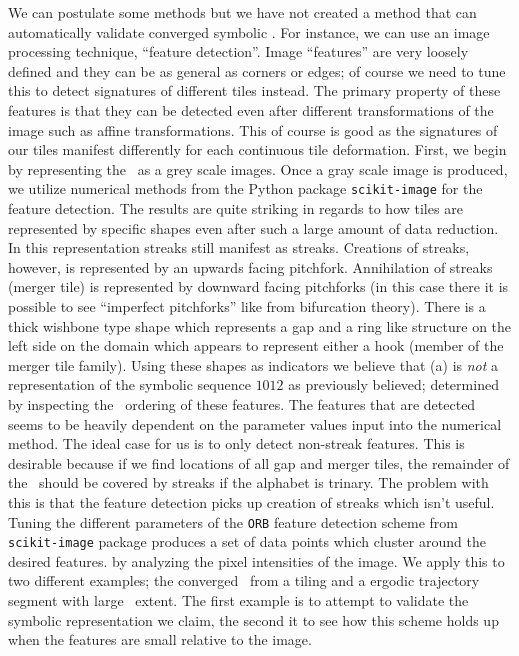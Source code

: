 We can postulate some methods but we have not created a method
that can automatically validate converged symbolic \twots. For instance,
we can use an image processing technique, ``feature detection''.
Image ``features'' are very loosely defined and they can be as general
as corners or edges; of course we need to tune this to
detect signatures of different tiles instead. The primary
property of these features is that they can be detected
even after different transformations of the image such as
affine transformations. This of course is good as the signatures
of our tiles manifest differently for each continuous tile
deformation.
First, we begin by representing the \twot\ as a grey scale
images. Once a gray scale image is produced, we utilize
numerical methods from the Python package \texttt{scikit-image} for
the feature detection.
The results are quite striking in regards to how tiles are represented by specific
shapes even after such a large amount of data reduction.
In this representation streaks still manifest as streaks. Creations of streaks, however,
is represented by an upwards facing pitchfork. Annihilation of streaks (merger tile) is
represented by downward facing pitchforks (in this case there
it is possible to see ``imperfect pitchforks'' like from bifurcation theory).
There is a thick wishbone type shape
which represents a gap and a ring like structure on the left side on
the domain which appears to represent either a hook (member of the
merger tile family).
Using these shapes as indicators we believe that (a) is \textit{not} a
representation of the symbolic sequence $1012$ as previously believed; determined
by inspecting the \spt\ ordering of these features.
The features that are detected seems
to be heavily dependent on the parameter values input into the numerical method.
The ideal case for us is to only detect non-streak features. This is desirable
because if we find locations of all gap and merger tiles, the remainder of the \twot\
should be covered by streaks if the alphabet is trinary. The problem with this is that
the feature detection picks up creation of streaks which isn't useful.
Tuning the different parameters of the \texttt{ORB} feature detection scheme
from \texttt{scikit-image} package produces a set of data points
which cluster around the desired features. by analyzing the pixel intensities
of the image. We apply this to two different examples; the converged \twot\
from a tiling and a ergodic trajectory segment with large \spt\ extent. The first
example is to attempt to validate the symbolic representation we claim, the second
it to see how this scheme holds up when the features are small relative to the image.


